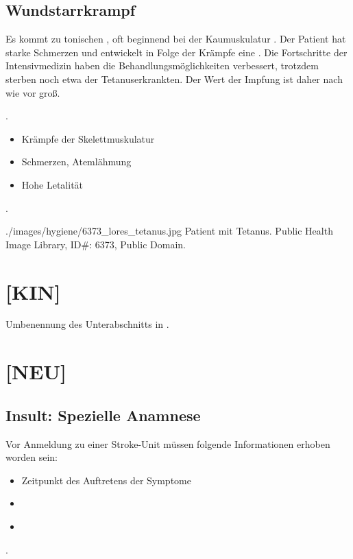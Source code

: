 \documentclass[
ngerman,
paper=a4,
asymmetric,
fontsize=10pt,
draft=false,
numbers=noenddot,
bibtotocnumbered,
footnotes=multiple,
]{scrreprt}
\newcommand{\jNEU}{\vspace{6pt}\noindent{\color{green}\sffamily\textbf{ADDED}\hrulefill\newline}}
\newcommand{\jNEUende}{\newline{\color{green}\rule{\linewidth}{3pt}\newline}}
\begin{document}
\subsection{Wundstarrkrampf}

 {%
 Es kommt zu tonischen , oft beginnend bei der
 Kaumuskulatur . Der Patient hat starke Schmerzen
 und entwickelt in Folge der Krämpfe eine . 
 Die Fortschritte der
 Intensivmedizin haben die Behandlungsmöglichkeiten
 verbessert, trotzdem sterben noch etwa \PC*
 der Tetanuserkrankten. Der Wert der
 Impfung ist daher nach wie vor groß.
 }
 {
 \jNEU
 .
\begin{itemize}
  \item Krämpfe der Skelettmuskulatur
  \item Schmerzen, Atemlähmung
  \item Hohe Letalität
\end{itemize}
.
\jNEUende
 }
 {./images/hygiene/6373_lores_tetanus.jpg}
 {Patient mit Tetanus.}
 {Public Health Image Library, ID\#: 6373, Public Domain.}

\section{[KIN]}
Umbenennung des Unterabschnitts  in .

\section{[NEU]}
\subsection{Insult: Spezielle Anamnese}
\jNEU
{}
{%
Vor Anmeldung zu einer Stroke-Unit müssen folgende
Informationen erhoben worden sein:

\begin{itemize}
  \item Zeitpunkt des Auftretens der Symptome
  \item 
\end{itemize}

}{
\begin{itemize}
  \item 
\end{itemize}

}{}{}{}
.
\jNEUende
\end{document}
